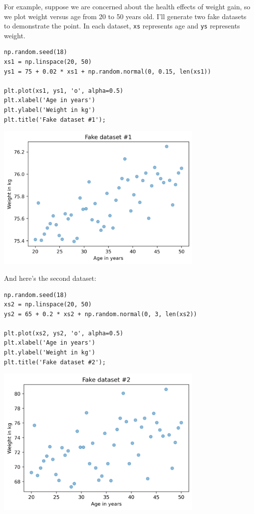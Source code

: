 For example, suppose we are concerned about the health effects of weight
gain, so we plot weight versus age from 20 to 50 years old. I'll
generate two fake datasets to demonstrate the point. In each dataset,
\passthrough{\lstinline!xs!} represents age and
\passthrough{\lstinline!ys!} represents weight.

\begin{lstlisting}[]
np.random.seed(18)
xs1 = np.linspace(20, 50)
ys1 = 75 + 0.02 * xs1 + np.random.normal(0, 0.15, len(xs1))

plt.plot(xs1, ys1, 'o', alpha=0.5)
plt.xlabel('Age in years')
plt.ylabel('Weight in kg')
plt.title('Fake dataset #1');
\end{lstlisting}

\begin{center}
\includegraphics[width=4in]{chapters/09_relationships_files/09_relationships_67_0.png}
\end{center}

And here's the second dataset:

\begin{lstlisting}[]
np.random.seed(18)
xs2 = np.linspace(20, 50)
ys2 = 65 + 0.2 * xs2 + np.random.normal(0, 3, len(xs2))

plt.plot(xs2, ys2, 'o', alpha=0.5)
plt.xlabel('Age in years')
plt.ylabel('Weight in kg')
plt.title('Fake dataset #2');
\end{lstlisting}

\begin{center}
\includegraphics[width=4in]{chapters/09_relationships_files/09_relationships_69_0.png}
\end{center}

